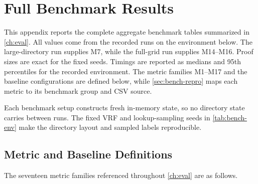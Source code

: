 \chapter{Full Benchmark Results}\label{app:benchmarks}

This appendix reports the complete aggregate benchmark tables summarized in \cref{ch:eval}. All
values come from the recorded runs on the environment below. The large-directory run supplies M7,
while the full-grid run supplies M14--M16. Proof sizes are exact for the fixed seeds. Timings are
reported as medians and 95th percentiles for the recorded environment. The metric families M1--M17
and the baseline configurations are defined below, while \cref{sec:bench-repro} maps each metric to
its benchmark group and CSV source.

Each benchmark setup constructs fresh in-memory state, so no directory state carries between runs.
The fixed VRF and lookup-sampling seeds in \cref{tab:bench-env} make the directory layout and sampled
labels reproducible.

\label{sec:bench-defs}
\section*{Metric and Baseline Definitions}

The seventeen metric families referenced throughout \cref{ch:eval} are as follows.


